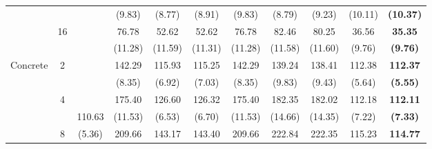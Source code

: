 \documentclass[letterpaper]{article} %
\begin{document}
\begin{table}[!t]
{\begin{tabular}{clcccccccc|cc}
\multicolumn{2}{c}{}                             &                       &                             & (9.83)                    & (8.77)                    & (8.91)                      & (9.83)                    & (8.79)                    & (9.23)                      & (10.11)             & \textbf{(10.37)}      \\
\multicolumn{2}{c}{}                             & \multirow{2}{*}{16}   &                             & 76.78                     & 52.62                     & 52.62                       & 76.78                     & 82.46                     & 80.25                       & 36.56               & \textbf{35.35}        \\
\multicolumn{2}{c}{}                             &                       &                             & (11.28)                   & (11.59)                   & (11.31)                     & (11.28)                   & (11.58)                   & (11.60)                     & (9.76)              & \textbf{(9.76)}       \\ \hline
\multicolumn{2}{c}{\multirow{8}{*}{Concrete}}    & \multirow{2}{*}{2}    &                             & 142.29                    & 115.93                    & 115.25                      & 142.29                    & 139.24                    & 138.41                      & 112.38              & \textbf{112.37}       \\
\multicolumn{2}{c}{}                             &                       &                             & (8.35)                    & (6.92)                    & (7.03)                      & (8.35)                    & (9.83)                    & (9.43)                      & (5.64)              & \textbf{(5.55)}       \\
\multicolumn{2}{c}{}                             & \multirow{2}{*}{4}    &                             & 175.40                    & 126.60                    & 126.32                      & 175.40                    & 182.35                    & 182.02                      & 112.18              & \textbf{112.11}       \\
\multicolumn{2}{c}{}                             &                       & 110.63                      & (11.53)                   & (6.53)                    & (6.70)                      & (11.53)                   & (14.66)                   & (14.35)                     & (7.22)              & \textbf{(7.33)}       \\
\multicolumn{2}{c}{}                             & \multirow{2}{*}{8}    & (5.36)                      & 209.66                    & 143.17                    & 143.40                      & 209.66                    & 222.84                    & 222.35                      & 115.23              & \textbf{114.77}       \\

\end{tabular}}
\end{table}
\end{document}
